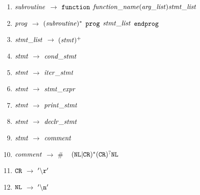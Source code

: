 \section*{}
\label{sec:grammar}

\begin{enumerate}
\item \noindent ${\it subroutine}$ $\rightarrow$ ${\tt function}$ ${\it function\_name} {\tt (} {\it arg\_list} {\tt )} {\it stmt\_list}$\\ 
\item ${\it prog}$ $\rightarrow$ $({\it subroutine})^{*}$ ${\tt prog}$ ${\it stmt\_list}$ ${\tt endprog}$\\
\item ${\it stmt\_list}$ $\rightarrow$ $({\it stmt})^{+}$\\ 

\item \noindent ${\it stmt}$ $\rightarrow$ ${\it cond\_stmt}$ \\
\item ${\it stmt}$ $\rightarrow$ ${\it iter\_stmt}$\\
\item ${\it stmt}$ $\rightarrow$ ${\it stmt\_expr}$\\
\item ${\it stmt}$ $\rightarrow$ ${\it print\_stmt}$\\
\item ${\it stmt}$ $\rightarrow$ ${\it declr\_stmt}$\\
\item ${\it stmt}$ $\rightarrow$ ${\it comment}$\\
  
\item ${\it comment}$ $\rightarrow$ $\#$ ~ $({\tt NL}|{\tt CR})^{*}({\tt CR})^{?}{\tt NL}$  \\
\item ${\tt CR}$ $\rightarrow$ ${\tt '\backslash r'}$\\
\item ${\tt NL}$ $\rightarrow$ ${\tt '\backslash n'}$\\


\end{enumerate}
